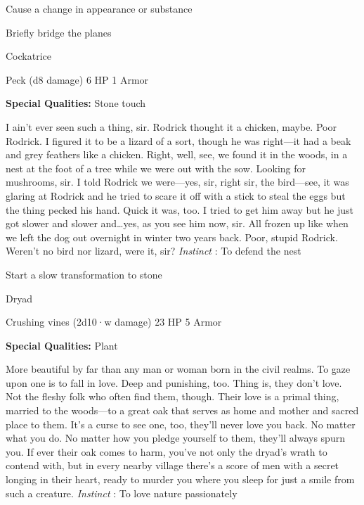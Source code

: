 \startitemize[1,packed]

\item Cause a change in appearance or substance

 
\item Briefly bridge the planes


\stopitemize
 
\startMonsterName
Cockatrice	 
\stopMonsterName
 

Peck (d8 damage)	6 HP	1 Armor

 


 
\startMonsterQualities
{\bf Special Qualities:}  Stone touch
\stopMonsterQualities
 
\startMonsterDescription
I ain’t ever seen such a thing, sir. Rodrick thought it a chicken, maybe. Poor Rodrick. I figured it to be a lizard of a sort, though he was right—it had a beak and grey feathers like a chicken. Right, well, see, we found it in the woods, in a nest at the foot of a tree while we were out with the sow. Looking for mushrooms, sir. I told Rodrick we were—yes, sir, right sir, the bird—see, it was glaring at Rodrick and he tried to scare it off with a stick to steal the eggs but the thing pecked his hand. Quick it was, too. I tried to get him away but he just got slower and slower and…yes, as you see him now, sir. All frozen up like when we left the dog out overnight in winter two years back. Poor, stupid Rodrick. Weren’t no bird nor lizard, were it, sir? {\em Instinct} : To defend the nest
\stopMonsterDescription
 
\startitemize[1,packed]

\item Start a slow transformation to stone


\stopitemize
 
\startMonsterName
Dryad	 
\stopMonsterName
 

Crushing vines (2d10·w damage)	23 HP	5 Armor

 


 
\startMonsterQualities
{\bf Special Qualities:}  Plant
\stopMonsterQualities
 
\startMonsterDescription
More beautiful by far than any man or woman born in the civil realms. To gaze upon one is to fall in love. Deep and punishing, too. Thing is, they don’t love. Not the fleshy folk who often find them, though. Their love is a primal thing, married to the woods—to a great oak that serves as home and mother and sacred place to them. It’s a curse to see one, too, they’ll never love you back. No matter what you do. No matter how you pledge yourself to them, they’ll always spurn you. If ever their oak comes to harm, you’ve not only the dryad’s wrath to contend with, but in every nearby village there’s a score of men with a secret longing in their heart, ready to murder you where you sleep for just a smile from such a creature. {\em Instinct} : To love nature passionately
\stopMonsterDescription
 
